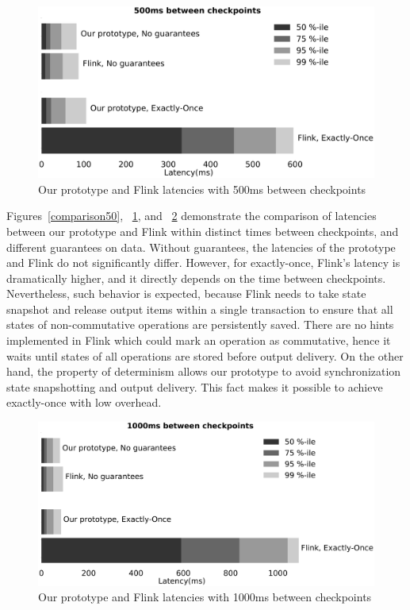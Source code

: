 \begin{figure}[htbp]
  \centering
  \includegraphics[width=.48\textwidth]{pics/comparison500}
  \caption{Our prototype and Flink latencies with 500ms between checkpoints}
  \label{comparison500}
\end{figure}

Figures~\ref{comparison50}, ~\ref{comparison500}, and ~\ref{comparison1000} demonstrate      the comparison of latencies between our prototype and Flink within distinct times between checkpoints, and different guarantees on data. Without guarantees, the latencies of the prototype and Flink do not significantly differ. However, for exactly-once, Flink's latency is dramatically higher, and it directly depends on the time between checkpoints. Nevertheless, such behavior is expected, because Flink needs to take state snapshot and release output items within a single transaction to ensure that all states of non-commutative operations are persistently saved. There are no hints implemented in Flink which could mark an operation as commutative, hence it waits until states of all operations are stored before output delivery. 
On the other hand, the property of determinism allows our prototype to avoid synchronization state snapshotting and output delivery. This fact makes it possible to achieve exactly-once with low overhead.

\begin{figure}[htbp]
  \centering
  \includegraphics[width=.48\textwidth]{pics/comparison1000}
  \caption{Our prototype and Flink latencies with 1000ms between checkpoints}
  \label{comparison1000}
\end{figure}
